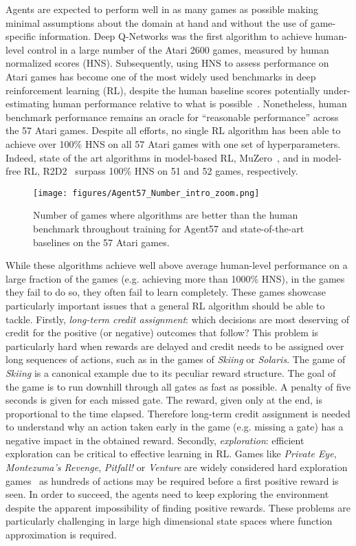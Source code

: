 \documentclass{article}
\begin{document}
Agents are expected to perform well in as many games as possible making minimal assumptions about the domain at hand and without the use of game-specific information.
Deep Q-Networks \citep[DQN ;][]{mnih2015human} was the first algorithm to achieve human-level control in
a large number of the Atari 2600 games, measured by human normalized scores (HNS). Subsequently, using HNS to assess performance on Atari games has become one of the most widely used benchmarks in deep reinforcement learning (RL), despite the human baseline scores potentially under-estimating human performance relative to what is possible~\citep{toromanoff2019deep}.
Nonetheless, human benchmark performance remains an oracle for ``reasonable performance'' across the 57 Atari games.
Despite all efforts, no single RL algorithm has been able to achieve over 100\% HNS on all 57 Atari games with one set of hyperparameters. 
Indeed, state of the art algorithms in model-based RL, MuZero~\citep{schrittwieser2019mastering}, and in model-free RL, R2D2~\citep{kapturowski2018recurrent} surpass 100\% HNS on 51 and 52 games, respectively. 
\begin{figure}[!t]
    \centering
    \texttt{[image: figures/Agent57\_Number\_intro\_zoom.png]}
    \caption{Number of games where algorithms are better than the human benchmark throughout training for Agent57 and state-of-the-art baselines on the 57 Atari games.} 
    \label{fig:cappedhns}
    \vspace{-2ex}
\end{figure}
While these algorithms achieve well above average human-level performance on a large fraction of the games (e.g. achieving more than 1000\% HNS), in the games they fail to do so, they often fail to learn completely.
These games showcase particularly important issues that a general RL algorithm should be able to tackle. Firstly, \emph{long-term credit assignment}: which decisions are most deserving of credit for the positive (or negative) outcomes that follow? This problem is particularly hard when rewards are delayed and credit needs to be assigned over long sequences of actions, such as in the games of \textit{Skiing} or \textit{Solaris}. The game of \textit{Skiing} is a canonical example due to its peculiar reward structure. The goal of the game is to run downhill through all gates as fast as possible. A penalty of five seconds is given for each missed gate.  The reward, given only at the end, is proportional to the time elapsed. Therefore long-term credit assignment is needed to understand why an action taken early in the game (e.g. missing a gate) has a negative impact in the obtained reward. 
Secondly, \emph{exploration}: efficient exploration can be critical to effective learning in RL. 
Games like \textit{Private Eye}, \textit{Montezuma's Revenge}, \textit{Pitfall!} or \textit{Venture} are widely considered hard exploration games~\citep{bellemare2016unifying, ostrovski2017count} as hundreds of actions may be required before a first positive reward is seen. In order to succeed, the agents need to keep exploring the environment despite the apparent impossibility of finding positive rewards.
These problems are particularly challenging in large high dimensional state spaces where function approximation is required.
\end{document}

